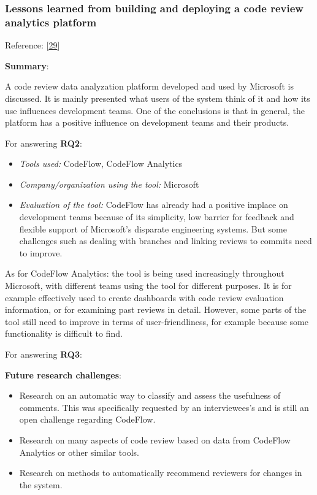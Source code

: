 \documentclass[]{book}
\providecommand{\tightlist}{%
  \setlength{\itemsep}{0pt}\setlength{\parskip}{0pt}}
\begin{document}
\subsubsection{Lessons learned from building and deploying a code review
analytics
platform}\label{lessons-learned-from-building-and-deploying-a-code-review-analytics-platform}

Reference: {[}\protect\hyperlink{ref-bird2015lessons}{29}{]}

\textbf{Summary}:

A code review data analyzation platform developed and used by Microsoft
is discussed. It is mainly presented what users of the system think of
it and how its use influences development teams. One of the conclusions
is that in general, the platform has a positive influence on development
teams and their products.

For answering \textbf{RQ2}:

\begin{itemize}
\tightlist
\item
  \emph{Tools used:} CodeFlow, CodeFlow Analytics
\item
  \emph{Company/organization using the tool:} Microsoft
\item
  \emph{Evaluation of the tool:} CodeFlow has already had a positive
  implace on development teams because of its simplicity, low barrier
  for feedback and flexible support of Microsoft's disparate engineering
  systems. But some challenges such as dealing with branches and linking
  reviews to commits need to improve.
\end{itemize}

As for CodeFlow Analytics: the tool is being used increasingly
throughout Microsoft, with different teams using the tool for different
purposes. It is for example effectively used to create dashboards with
code review evaluation information, or for examining past reviews in
detail. However, some parts of the tool still need to improve in terms
of user-friendliness, for example because some functionality is
difficult to find.

For answering \textbf{RQ3}:

\textbf{Future research challenges}:

\begin{itemize}
\tightlist
\item
  Research on an automatic way to classify and assess the usefulness of
  comments. This was specifically requested by an interviewees's and is
  still an open challenge regarding CodeFlow.
\item
  Research on many aspects of code review based on data from CodeFlow
  Analytics or other similar tools.
\item
  Research on methods to automatically recommend reviewers for changes
  in the system.
\end{itemize}
\end{document}
